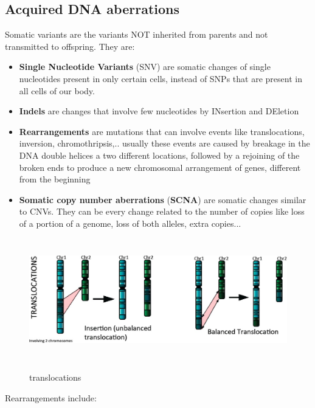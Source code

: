 \hypertarget{acquired-dna-aberrations}{%
\subsection{Acquired DNA aberrations}\label{acquired-dna-aberrations}}


Somatic variants are the variants NOT inherited from parents and not transmitted
to offspring. They are:

\begin{itemize}
  \item \textbf{Single Nucleotide Variants} (SNV) are somatic changes of single
  nucleotides present in only certain cells, instead of SNPs that are present in
  all cells of our body.
  \item \textbf{Indels} are changes that involve few nucleotides by INsertion
  and DEletion
  \item \textbf{Rearrangements} are mutations that can involve events like
translocations, inversion, chromothripsis,.. usually these events are caused by
breakage in the DNA double helices a two different locations, followed by a
rejoining of the broken ends to produce a new chromosomal arrangement of genes,
different from the beginning

  \item \textbf{Somatic copy number aberrations} (\textbf{SCNA}) are somatic
changes similar to CNVs. They can be every change related to the number of
copies like loss of a portion of a genome, loss of both alleles, extra copies...
\end{itemize}

\begin{figure}[H]
  \includegraphics[width=6.1748in,height=2.09646in]{image6.jpeg}\\
  \centering
  \caption{translocations}
  \label{fig: translocations}
\end{figure}

Rearrangements include:

